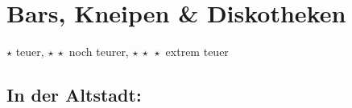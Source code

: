 \newcommand{\place}[4]{\item[(\stepcounter{zahl}\thezahl) #1](#2)\\ #3\\\emph{Preis:} #4}


\section{Bars, Kneipen \& Diskotheken}
$\star$ teuer, $\star\ \star$ noch teurer, $\star\ \star\ \star$ extrem teuer

\subsection{In der Altstadt:}
